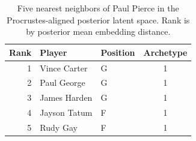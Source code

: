 \begin{table}[htbp]
  \centering\small
  \begin{tabular}{rllc}
    \toprule
    Rank & Player & Position & Archetype \\
    \midrule
    1 & Vince Carter & G & 1 \\
    2 & Paul George & G & 1 \\
    3 & James Harden & G & 1 \\
    4 & Jayson Tatum & F & 1 \\
    5 & Rudy Gay & F & 1 \\
    \bottomrule
  \end{tabular}
  \caption{Five nearest neighbors of Paul Pierce in the Procrustes-aligned posterior latent space. Rank is by posterior mean embedding distance.}
  \label{tab:Paul_Pierce_neighbors}
\end{table}

